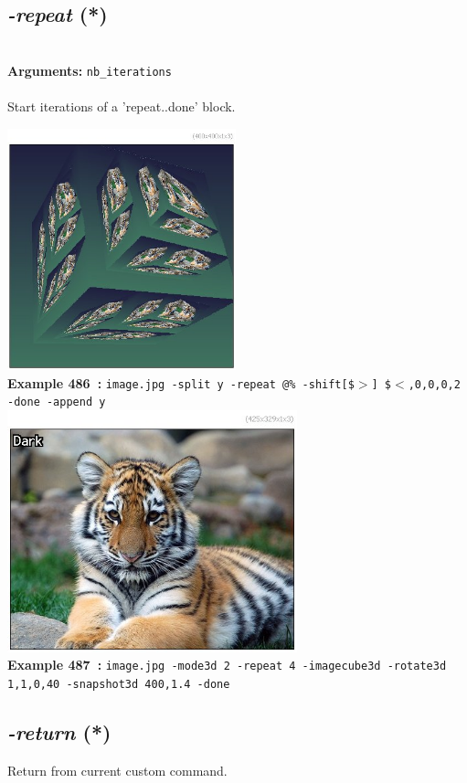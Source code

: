 \documentclass[a4paper,11pt,twoside]{book}
\begin{document}
\subsection{\emph{-repeat} (*)}\vspace*{-0.5em}
~\\\textbf{Arguments: } 
{\small \texttt{nb\_iterations}}\\~\\
Start iterations of a 'repeat..done' block.
\begin{center}\includegraphics[keepaspectratio=true,height=7cm,width=\textwidth]{img/gmic_def486.jpg}\\
{\footnotesize \textbf{Example 486~:} \texttt{image.jpg -split y -repeat @\% -shift[\$$>$] \$$<$,0,0,0,2 -done -append y}}
\\\includegraphics[keepaspectratio=true,height=7cm,width=\textwidth]{img/gmic_def487.jpg}\\
{\footnotesize \textbf{Example 487~:} \texttt{image.jpg -mode3d 2 -repeat 4 -imagecube3d -rotate3d 1,1,0,40 -snapshot3d 400,1.4 -done}}
\end{center}

\subsection{\emph{-return} (*)}\vspace*{-0.5em}
Return from current custom command.
\end{document}

